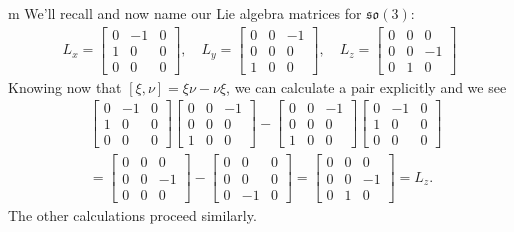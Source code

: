 \documentclass[11pt]{article}
\begin{document}
\begin{example}{m}
We'll recall and now name our Lie algebra matrices for $\mathfrak{so}(3)$:
\begin{gather*}
L_x =\begin{bmatrix}
0 & -1 & 0 \\
1 & 0 & 0 \\
0 & 0 & 0
\end{bmatrix}, \hspace{1em} L_y = \begin{bmatrix}
0 & 0 & -1 \\
0 & 0 & 0 \\
1 & 0 & 0
\end{bmatrix}, \hspace{1em} L_z = \begin{bmatrix}
0 & 0 & 0 \\
0 & 0 & -1 \\
0 & 1 & 0
\end{bmatrix} 
\end{gather*}
Knowing now that $[\xi,\nu] = \xi\nu - \nu\xi$, we can calculate a pair explicitly and we see \begin{align*}
&\begin{bmatrix}
0 & -1 & 0 \\
1 & 0 & 0 \\
0 & 0 & 0
\end{bmatrix}\begin{bmatrix}
0 & 0 & -1 \\
0 & 0 & 0 \\
1 & 0 & 0
\end{bmatrix} - \begin{bmatrix}
0 & 0 & -1 \\
0 & 0 & 0 \\
1 & 0 & 0
\end{bmatrix} \begin{bmatrix}
0 & -1 & 0 \\
1 & 0 & 0 \\
0 & 0 & 0
\end{bmatrix} \\
&= \begin{bmatrix}
0 & 0 & 0 \\
0 & 0 & -1 \\
0 & 0 & 0
\end{bmatrix} - \begin{bmatrix}
0 & 0 & 0 \\
0 & 0 & 0 \\
0 & -1 & 0
\end{bmatrix} = \begin{bmatrix}
0 & 0 & 0 \\
0 & 0 & -1 \\
0 & 1 & 0
\end{bmatrix} = L_z.
\end{align*}
The other calculations proceed similarly.
\end{example}
\end{document}
